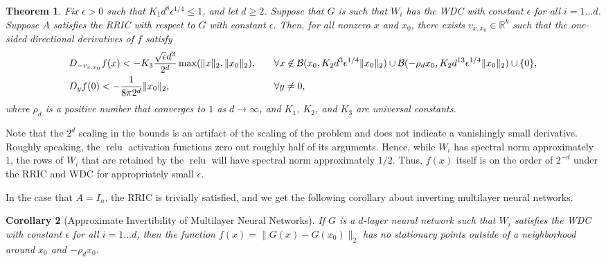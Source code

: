 \documentclass[11pt]{article}
\newtheorem{theorem}{Theorem} %
\newtheorem{corollary}[theorem]{Corollary}
\newcommand{\R}{\mathbb{R}}
\newcommand{\calB}{\mathcal{B}}
\newcommand{\eps}{\epsilon}
\newcommand{\zetacheck}{\rho}
\newcommand{\red}[1]{{\color{black} #1}}
\newcommand{\xo}{x_0}
\newcommand{\vxxo}{v_{x, \xo}}
\DeclareMathOperator{\relu}{relu}
\begin{document}
\begin{theorem} \label{thm-multi-layer-deterministic}
Fix $\eps >0$ such that $K_1 d^8 \eps^{1/4} \leq 1$, and let $d \geq 2$.  Suppose that $G$ is such that $W_i$ has the  WDC with constant $\eps$ for all $i = 1 \ldots d$.  Suppose $A$ satisfies the RRIC with respect to $G$ with constant $\eps$.  Then, for all nonzero $x$ and $\xo$, there exists $\vxxo \in \R^k$ such that the one-sided directional derivatives of $f$ satisfy
\begin{alignat*}{2}
&D_{-\vxxo} f(x) < \red{-K_3 \frac{\sqrt{\eps} d^3}{2^d} \max(\|x\|_2, \|\xo\|_2)}, \quad & & \forall x  \not\in  \calB(\xo, K_2 d^{3} \eps^{1/4} \|\xo\|_2) \cup \calB(-\zetacheck_d \xo, K_2 d^{13} \eps^{1/4} \|\xo\|_2) \cup \{0\},\\
&D_y f(0) < \red{- \frac{1}{8 \pi 2^d} \|\xo\|_2}, & &\forall y \neq 0,
\end{alignat*}
where $\rho_d$ is a positive number that converges to $1$ as $d \to \infty$,  and $K_1$, $K_2$, and $K_3$ are universal constants.
\end{theorem}
\red{Note that the $2^d$ scaling in the bounds is an artifact of the scaling of the problem and does not indicate a vanishingly small derivative.  Roughly speaking, the $\relu$ activation functions zero out roughly half of its arguments.  Hence, while $W_i$ has spectral norm approximately $1$, the rows of $W_i$ that are retained by the $\relu$ will have spectral norm approximately $1/2$.  Thus, $f(x)$ itself is on the order of $2^{-d}$ under the RRIC and WDC for appropriately small $\eps$.  }

In the case that $A = I_n$, the RRIC is trivially satisfied, and we get the following corollary about inverting multilayer neural networks.
\begin{corollary}[Approximate Invertibility of Multilayer Neural Networks]
If $G$ is a $d$-layer neural network such that $W_i$ satisfies the WDC with constant $\eps$ for all $i = 1 \ldots d$, then the function $f(x) = \|G(x) - G(\xo)\|_2$ has no stationary points outside of a neighborhood around $\xo$ and $-\rho_d \xo$. 
\end{corollary}
\end{document}
